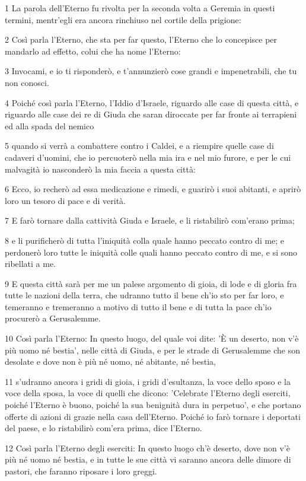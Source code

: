 \par 1 La parola dell'Eterno fu rivolta per la seconda volta a Geremia in questi termini, mentr'egli era ancora rinchiuso nel cortile della prigione:
\par 2 Così parla l'Eterno, che sta per far questo, l'Eterno che lo concepisce per mandarlo ad effetto, colui che ha nome l'Eterno:
\par 3 Invocami, e io ti risponderò, e t'annunzierò cose grandi e impenetrabili, che tu non conosci.
\par 4 Poiché così parla l'Eterno, l'Iddio d'Israele, riguardo alle case di questa città, e riguardo alle case dei re di Giuda che saran diroccate per far fronte ai terrapieni ed alla spada del nemico
\par 5 quando si verrà a combattere contro i Caldei, e a riempire quelle case di cadaveri d'uomini, che io percuoterò nella mia ira e nel mio furore, e per le cui malvagità io nasconderò la mia faccia a questa città:
\par 6 Ecco, io recherò ad essa medicazione e rimedi, e guarirò i suoi abitanti, e aprirò loro un tesoro di pace e di verità.
\par 7 E farò tornare dalla cattività Giuda e Israele, e li ristabilirò com'erano prima;
\par 8 e li purificherò di tutta l'iniquità colla quale hanno peccato contro di me; e perdonerò loro tutte le iniquità colle quali hanno peccato contro di me, e si sono ribellati a me.
\par 9 E questa città sarà per me un palese argomento di gioia, di lode e di gloria fra tutte le nazioni della terra, che udranno tutto il bene ch'io sto per far loro, e temeranno e tremeranno a motivo di tutto il bene e di tutta la pace ch'io procurerò a Gerusalemme.
\par 10 Così parla l'Eterno: In questo luogo, del quale voi dite: 'È un deserto, non v'è più uomo né bestia', nelle città di Giuda, e per le strade di Gerusalemme che son desolate e dove non è più né uomo, né abitante, né bestia,
\par 11 s'udranno ancora i gridi di gioia, i gridi d'esultanza, la voce dello sposo e la voce della sposa, la voce di quelli che dicono: 'Celebrate l'Eterno degli eserciti, poiché l'Eterno è buono, poiché la sua benignità dura in perpetuo', e che portano offerte di azioni di grazie nella casa dell'Eterno. Poiché io farò tornare i deportati del paese, e lo ristabilirò com'era prima, dice l'Eterno.
\par 12 Così parla l'Eterno degli eserciti: In questo luogo ch'è deserto, dove non v'è più né uomo né bestia, e in tutte le sue città vi saranno ancora delle dimore di pastori, che faranno riposare i loro greggi.
